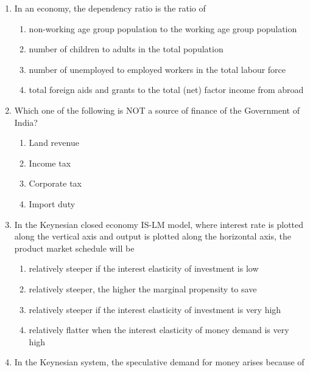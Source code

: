 \documentclass{article}
\begin{document}
\begin{enumerate}[leftmargin=*, start=27, label=Q.\arabic*.]
    \item In an economy, the dependency ratio is the ratio of
    
    \begin{enumerate}
        \item non-working age group population to the working age group population 
        \item number of children to adults in the total population
        \item number of unemployed to employed workers in the total labour force 
        \item total foreign aids and grants to the total (net) factor income from abroad
    \end{enumerate}
       
    \item Which one of the following is NOT a source of finance of the Government of India?
    
    \begin{multicols}{4}
        \begin{enumerate}
            \item Land revenue
            \item Income tax
            \item Corporate tax
            \item Import duty
        \end{enumerate}
    \end{multicols}

    \item In the Keynesian closed economy IS-LM model, where interest rate is plotted along the vertical axis and output is plotted along the horizontal axis, the product market schedule will be
    
    \begin{enumerate}
        \item relatively steeper if the interest elasticity of investment is low
        \item relatively steeper, the higher the marginal propensity to save
        \item relatively steeper if the interest elasticity of investment is very high
        \item relatively flatter when the interest elasticity of money demand is very high
    \end{enumerate}

    \item In the Keynesian system, the speculative demand for money arises because of
    

\end{enumerate}
\end{document}
